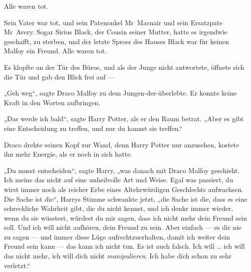 Alle waren tot.

Sein Vater war tot, und sein Patenonkel Mr~Macnair und sein Ersatzpate Mr~Avery. Sogar Sirius Black, der Cousin seiner Mutter, hatte es irgendwie geschafft, zu sterben, und der letzte Spross des Hauses Black war für keinen Malfoy ein Freund. Alle waren tot.

Es klopfte an der Tür des Büros, und als der Junge nicht antwortete, öffnete sich die Tür und gab den Blick frei auf —

„Geh weg“, sagte Draco Malfoy zu dem Jungen-der-überlebte. Er konnte keine Kraft in den Worten aufbringen.

„Das werde ich bald“, sagte Harry Potter, als er den Raum betrat.
„Aber es gibt eine Entscheidung zu treffen, und nur du kannst sie treffen.“

Draco drehte seinen Kopf zur Wand, denn Harry Potter nur anzusehen, kostete ihn mehr Energie, als er noch in sich hatte.

„Du musst entscheiden“, sagte Harry, „was danach mit Draco Malfoy geschieht. Ich meine das nicht auf eine unheilvolle Art und Weise. Egal was passiert, du wirst immer noch als reicher Erbe eines Altehrwürdigen Geschlechts aufwachsen. Die Sache ist die“, Harrys Stimme schwankte jetzt, „die Sache ist die, dass es eine schreckliche Wahrheit gibt, die du nicht kennst, und ich denke immer wieder, wenn du sie wüsstest, würdest du mir sagen, dass ich nicht mehr dein Freund sein soll. Und ich will nicht aufhören, dein Freund zu sein. Aber einfach — es dir nie zu sagen — und immer diese Lüge aufrechtzuerhalten, damit ich weiter dein Freund sein kann — das kann ich nicht tun. Es ist auch falsch. Ich will … ich will das nicht mehr, ich will dich nicht \emph{manipulieren}. Ich habe dich schon zu sehr verletzt.“

